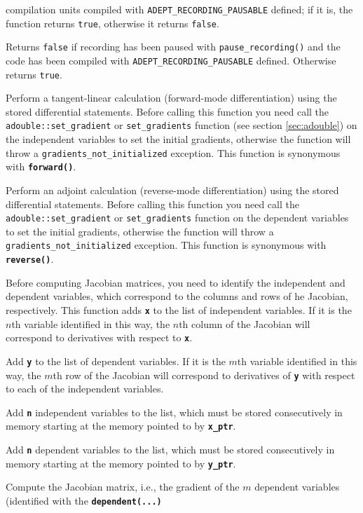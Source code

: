 \documentclass[a4,oneside]{book}
\def\codesize{\small}
\def\code#1{{\codesize\texttt{#1}}}
\def\codebf#1{{\codesize\texttt{\textbf{#1}}}}
\def\citem#1{\item[{\codesize\texttt{#1}}]}
\def\Offset{size\_t}
\begin{document}
\begin{description}
compilation units compiled with \code{ADEPT\_RECORDING\_PAUSABLE}
defined; if it is, the function returns \code{true}, otherwise it
returns \code{false}.
%
\citem{bool is\_recording()} Returns \code{false} if recording has
  been paused with \code{pause\_recording()} and the code has been
  compiled with \code{ADEPT\_RECORDING\_PAUSABLE} defined.
  Otherwise returns \code{true}.
%
\citem{void compute\_tangent\_linear()} Perform a tangent-linear
calculation (forward-mode differentiation) using the stored
differential statements.  Before calling this function you need call
the \code{adouble::set\_gradient} or \code{set\_gradients} function (see
section \ref{sec:adouble}) on the independent variables to set the
initial gradients, otherwise the function will throw a
\code{gradients\_not\_initialized} exception. This function is
synonymous with \codebf{forward()}.
%
\citem{void compute\_adjoint()} Perform an adjoint calculation
(reverse-mode differentiation) using the stored differential
statements.  Before calling this function you need call the
\code{adouble::set\_gradient} or \code{set\_gradients} function on the
dependent variables to set the initial gradients, otherwise the
function will throw a \code{gradients\_not\_initialized}
exception. This function is synonymous with \codebf{reverse()}.
%
\citem{void independent(const adouble\&\ x)} Before computing Jacobian
  matrices, you need to identify the independent and dependent
  variables, which correspond to the columns and rows of he Jacobian,
  respectively. This function adds \codebf{x} to the list of
  independent variables. If it is the $n$th variable identified in
  this way, the $n$th column of the Jacobian will correspond to
  derivatives with respect to \codebf{x}.
\citem{void dependent(const adouble\&\ y)} Add \codebf{y} to the
  list of dependent variables.  If it is the $m$th variable identified
  in this way, the $m$th row of the Jacobian will correspond to
  derivatives of \codebf{y} with respect to each of the independent
  variables.
\citem{void independent(const adouble* x\_ptr, \Offset\ n)} Add
  \codebf{n} independent variables to the list, which must be
  stored consecutively in memory starting at the memory pointed to by
  \codebf{x\_ptr}.
\citem{void dependent(const adouble* y\_ptr, \Offset\ n)} Add
\codebf{n} dependent variables to the list, which must be stored
consecutively in memory starting at the memory pointed to by
\codebf{y\_ptr}.
%
\citem{void jacobian(double* jacobian\_out)} Compute the Jacobian matrix, i.e., the gradient of the $m$
dependent variables (identified with the \codebf{dependent(...)}

\end{description}
\end{document}
